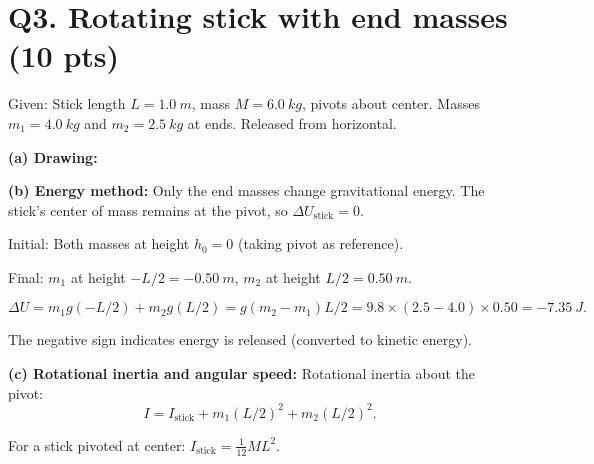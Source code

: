 \documentclass[11pt]{article}
\newcommand{\ans}[1]{\boxed{\displaystyle #1}}
\begin{document}
\section*{Q3. Rotating stick with end masses (10 pts)}
Given: Stick length $L = \SI{1.0}{m}$, mass $M = \SI{6.0}{kg}$, pivots about center. Masses $m_1 = \SI{4.0}{kg}$ and $m_2 = \SI{2.5}{kg}$ at ends. Released from horizontal.

\textbf{(a) Drawing:}
\begin{center}
\end{center}

\textbf{(b) Energy method:} Only the end masses change gravitational energy. The stick's center of mass remains at the pivot, so $\Delta U_{\text{stick}} = 0$.

Initial: Both masses at height $h_0 = 0$ (taking pivot as reference).

Final: $m_1$ at height $-L/2 = -\SI{0.50}{m}$, $m_2$ at height $L/2 = \SI{0.50}{m}$.

\[ \Delta U = m_1 g(-L/2) + m_2 g(L/2) = g(m_2 - m_1)L/2 = 9.8 \times (2.5 - 4.0) \times 0.50 = \ans{\SI{-7.35}{J}}. \]

The negative sign indicates energy is released (converted to kinetic energy).

\textbf{(c) Rotational inertia and angular speed:} Rotational inertia about the pivot:
\[ I = I_{\text{stick}} + m_1(L/2)^2 + m_2(L/2)^2. \]

For a stick pivoted at center: $I_{\text{stick}} = \frac{1}{12}ML^2$.
\end{document}
